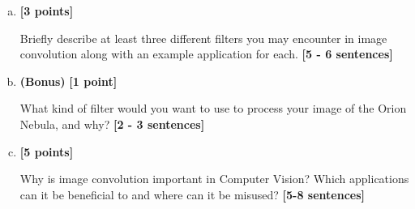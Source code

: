 \documentclass[11pt]{article}
\begin{document}
\begin{enumerate}[(a)]
\begin{enumerate}[(i)]
\begin{tcolorbox}[colback=white!5!white,colframe=green!75!black]
{{        %
        }}
\end{tcolorbox}
    
\end{enumerate}


\item \textbf{[3 points]} 
\begin{tcolorbox}[colback=orange!5!white,colframe=orange!75!black]
Briefly describe at least three different filters you may encounter in image convolution along with an example application for each. \textbf{[5 - 6 sentences]}
\end{tcolorbox}


\item \textbf{(Bonus)} \textbf{[1 point]}
\begin{tcolorbox}[colback=blue!5!white,colframe=blue!75!black]
What kind of filter would you want to use to process your image of the Orion Nebula, and why? \textbf{[2 - 3 sentences]}
\end{tcolorbox}

\pagebreak

\item \textbf{[5 points]} 
\begin{tcolorbox}[colback=orange!5!white,colframe=orange!75!black]
Why is image convolution important in Computer Vision? Which applications can it be beneficial to and where can it be misused? \textbf{[5-8 sentences]}
\end{tcolorbox}


\end{enumerate}
\end{document}
